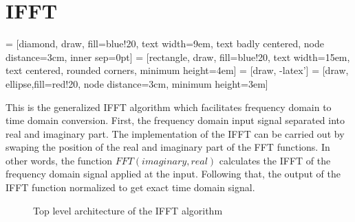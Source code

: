 %
%
\clearpage
\section{IFFT}

 = [diamond, draw, fill=blue!20, 
text width=9em, text badly centered, node distance=3cm, inner sep=0pt]
 = [rectangle, draw, fill=blue!20, 
text width=15em, text centered, rounded corners, minimum height=4em]
 = [draw, -latex']
 = [draw, ellipse,fill=red!20, node distance=3cm,
minimum height=3em]


This is the generalized IFFT algorithm which facilitates frequency domain to time domain conversion. First, the frequency domain input signal separated into real and imaginary part. The implementation of the IFFT can be carried out by swaping the position of the real and imaginary part of the FFT functions. In other words, the function $FFT(imaginary,real)$ calculates the IFFT of the frequency domain signal applied at the input. Following that, the output of the IFFT function normalized to get exact time domain signal.

\begin{center}
\begin{figure}[ht]

\begin{center}
\end{center}
\vspace{0.5cm}
\caption{Top level architecture of the IFFT algorithm}
\label{Top_level_FFT }
\end{figure}
\end{center}

